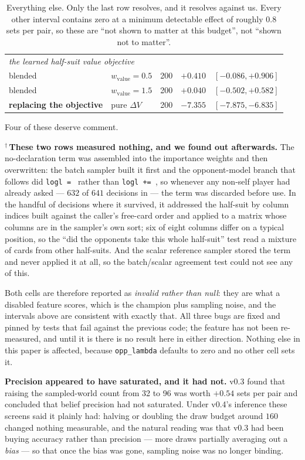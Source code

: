 \documentclass[11pt,a4paper]{article}
\begin{document}
\begin{table}[t]
\begin{tabular}{llrrl}
\midrule
\multicolumn{5}{l}{\emph{the learned half-suit value objective}}\\
blended & $w_{\mathrm{value}} = 0.5$ & 200 & $+0.410$ & $[-0.086, +0.906]$ \\
blended & $w_{\mathrm{value}} = 1.5$ & 200 & $+0.040$ & $[-0.502, +0.582]$ \\
\textbf{replacing the objective} & pure $\Delta V$ & 200 & $\mathbf{-7.355}$ & $[-7.875, -6.835]$ \\
\bottomrule
\end{tabular}
\caption{Everything else. Only the last row resolves, and it resolves against
us. Every other interval contains zero at a minimum detectable effect of
roughly $0.8$ sets per pair, so these are ``not shown to matter at this budget'',
not ``shown not to matter''.}
\label{tab:nulls}
\end{table}

Four of these deserve comment.

$^\dagger$\,\textbf{These two rows measured nothing, and we found out
afterwards.} The no-declaration term was assembled into the importance weights
and then overwritten: the batch sampler built it first and the opponent-model
branch that follows did \texttt{logl = } rather than \texttt{logl += }, so
whenever any non-self player had already asked --- $632$ of $641$ decisions in
 --- the term was discarded before use. In the
handful of decisions where it survived, it addressed the half-suit by column
indices built against the caller's free-card order and applied to a matrix whose
columns are in the sampler's own sort; six of eight columns differ on a typical
position, so the ``did the opponents take this whole half-suit'' test read a
mixture of cards from other half-suits. And the scalar reference sampler stored
the term and never applied it at all, so the batch/scalar agreement test could
not see any of this.

Both cells are therefore reported as \emph{invalid rather than null}: they are
what a disabled feature scores, which is the champion plus sampling noise, and
the intervals above are consistent with exactly that. All three bugs are fixed
and pinned by tests that fail against the previous code; the feature has not
been re-measured, and until it is there is no result here in either direction.
Nothing else in this paper is affected, because \texttt{opp\_lambda} defaults to
zero and no other cell sets it.

\textbf{Precision appeared to have saturated, and it had not.} v0.3 found that
raising the sampled-world count from 32 to 96 was worth $+0.54$ sets per pair
and concluded that belief precision had not saturated. Under v0.4's inference
these screens said it plainly had: halving or doubling the draw budget around
$160$ changed nothing measurable, and the natural reading was that v0.3 had been
buying accuracy rather than precision --- more draws partially averaging out a
\emph{bias} --- so that once the bias was gone, sampling noise was no longer
binding.
\end{document}
